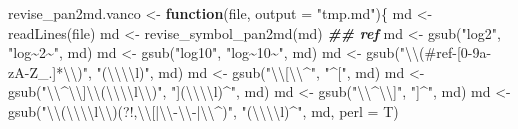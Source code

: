 \documentclass[
]{article}
\newenvironment{Shaded}{\begin{snugshade}}{\end{snugshade}}
\newcommand{\AttributeTok}[1]{\textcolor[rgb]{0.77,0.63,0.00}{#1}}
\newcommand{\ControlFlowTok}[1]{\textcolor[rgb]{0.13,0.29,0.53}{\textbf{#1}}}
\newcommand{\DocumentationTok}[1]{\textcolor[rgb]{0.56,0.35,0.01}{\textbf{\textit{#1}}}}
\newcommand{\FunctionTok}[1]{\textcolor[rgb]{0.00,0.00,0.00}{#1}}
\newcommand{\NormalTok}[1]{#1}
\newcommand{\OtherTok}[1]{\textcolor[rgb]{0.56,0.35,0.01}{#1}}
\newcommand{\SpecialCharTok}[1]{\textcolor[rgb]{0.00,0.00,0.00}{#1}}
\newcommand{\StringTok}[1]{\textcolor[rgb]{0.31,0.60,0.02}{#1}}
\begin{document}
\begin{Shaded}
\begin{Highlighting}[]
\NormalTok{revise\_pan2md.vanco }\OtherTok{\textless{}{-}} \ControlFlowTok{function}\NormalTok{(file, }\AttributeTok{output =} \StringTok{"tmp.md"}\NormalTok{)\{}
\NormalTok{  md }\OtherTok{\textless{}{-}} \FunctionTok{readLines}\NormalTok{(file)}
\NormalTok{  md }\OtherTok{\textless{}{-}} \FunctionTok{revise\_symbol\_pan2md}\NormalTok{(md)}
  \DocumentationTok{\#\# ref}
\NormalTok{  md }\OtherTok{\textless{}{-}} \FunctionTok{gsub}\NormalTok{(}\StringTok{"log2"}\NormalTok{, }\StringTok{"log\textasciitilde{}2\textasciitilde{}"}\NormalTok{, md)}
\NormalTok{  md }\OtherTok{\textless{}{-}} \FunctionTok{gsub}\NormalTok{(}\StringTok{"log10"}\NormalTok{, }\StringTok{"log\textasciitilde{}10\textasciitilde{}"}\NormalTok{, md)}
\NormalTok{  md }\OtherTok{\textless{}{-}} \FunctionTok{gsub}\NormalTok{(}\StringTok{"}\SpecialCharTok{\textbackslash{}\textbackslash{}}\StringTok{(\#ref{-}[0{-}9a{-}zA{-}Z\_.]*}\SpecialCharTok{\textbackslash{}\textbackslash{}}\StringTok{)"}\NormalTok{, }\StringTok{"(}\SpecialCharTok{\textbackslash{}\textbackslash{}\textbackslash{}\textbackslash{}}\StringTok{l)"}\NormalTok{, md)}
\NormalTok{  md }\OtherTok{\textless{}{-}} \FunctionTok{gsub}\NormalTok{(}\StringTok{"}\SpecialCharTok{\textbackslash{}\textbackslash{}}\StringTok{[}\SpecialCharTok{\textbackslash{}\textbackslash{}}\StringTok{\^{}"}\NormalTok{, }\StringTok{"\^{}["}\NormalTok{, md)}
\NormalTok{  md }\OtherTok{\textless{}{-}} \FunctionTok{gsub}\NormalTok{(}\StringTok{"}\SpecialCharTok{\textbackslash{}\textbackslash{}}\StringTok{\^{}}\SpecialCharTok{\textbackslash{}\textbackslash{}}\StringTok{]}\SpecialCharTok{\textbackslash{}\textbackslash{}}\StringTok{(}\SpecialCharTok{\textbackslash{}\textbackslash{}\textbackslash{}\textbackslash{}}\StringTok{l}\SpecialCharTok{\textbackslash{}\textbackslash{}}\StringTok{)"}\NormalTok{, }\StringTok{"](}\SpecialCharTok{\textbackslash{}\textbackslash{}\textbackslash{}\textbackslash{}}\StringTok{l)\^{}"}\NormalTok{, md)}
\NormalTok{  md }\OtherTok{\textless{}{-}} \FunctionTok{gsub}\NormalTok{(}\StringTok{"}\SpecialCharTok{\textbackslash{}\textbackslash{}}\StringTok{\^{}}\SpecialCharTok{\textbackslash{}\textbackslash{}}\StringTok{]"}\NormalTok{, }\StringTok{"]\^{}"}\NormalTok{, md)}
\NormalTok{  md }\OtherTok{\textless{}{-}} \FunctionTok{gsub}\NormalTok{(}\StringTok{"}\SpecialCharTok{\textbackslash{}\textbackslash{}}\StringTok{(}\SpecialCharTok{\textbackslash{}\textbackslash{}\textbackslash{}\textbackslash{}}\StringTok{l}\SpecialCharTok{\textbackslash{}\textbackslash{}}\StringTok{)(?!,}\SpecialCharTok{\textbackslash{}\textbackslash{}}\StringTok{[|}\SpecialCharTok{\textbackslash{}\textbackslash{}}\StringTok{{-}}\SpecialCharTok{\textbackslash{}\textbackslash{}}\StringTok{{-}|}\SpecialCharTok{\textbackslash{}\textbackslash{}}\StringTok{\^{})"}\NormalTok{, }\StringTok{"(}\SpecialCharTok{\textbackslash{}\textbackslash{}\textbackslash{}\textbackslash{}}\StringTok{l)\^{}"}\NormalTok{, md, }\AttributeTok{perl =}\NormalTok{ T)}

\end{Highlighting}
\end{Shaded}
\end{document}
